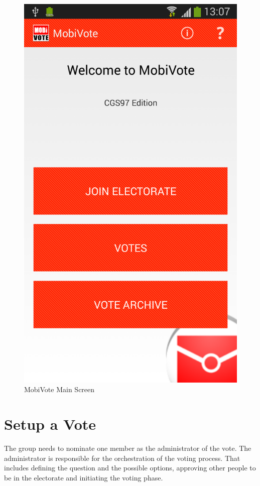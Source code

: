 \documentclass[numbers=noenddot, abstract=on, a4paper, headsepline,
footsepline, oneside, draft=off]{scrreprt}
\begin{document}
\begin{figure}[!htb] \centering
\includegraphics[height=.4\textheight]{img/screenshots/main}
	\caption{MobiVote Main Screen}
	\label{fig:handbook_mainscreen}
\end{figure}

\section{Setup a Vote}
The group needs to nominate one member as the administrator of the vote. The
administrator is responsible for the orchestration of the voting process. That
includes defining the question and the possible options, approving other people
to be in the electorate and initiating the voting phase.
\end{document}
